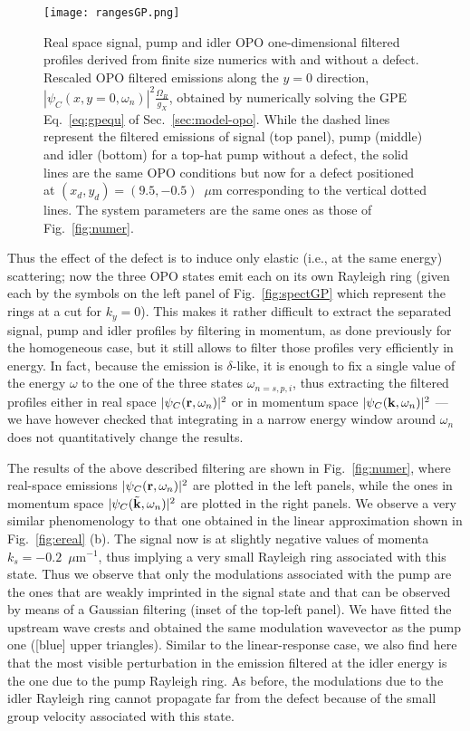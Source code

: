\begin{figure}[tb]\centering
\texttt{[image: rangesGP.png]}
\caption{Real space signal, pump and idler OPO one-dimensional
  filtered profiles derived from finite size numerics with and without
  a defect. Rescaled OPO filtered emissions along the $y=0$ direction,
  $|\psi_C(x,y=0,\omega_n)|^2 \frac{\Omega_R}{g_X}$, obtained by
  numerically solving the GPE Eq.~\eqref{eq:gpequ} of
  Sec.~\ref{sec:model-opo}. While the dashed lines represent the
  filtered emissions of signal (top panel), pump (middle) and idler
  (bottom) for a top-hat pump without a defect, the solid lines are
  the same OPO conditions but now for a defect positioned at
  $(x_d, y_d) = (9.5, -0.5)$~$\mu$m corresponding to the vertical
  dotted lines. The system parameters are the same ones as those of
  Fig.~\ref{fig:numer}.}
\label{fig:rafull}
\end{figure}
%
Thus the effect of the defect is to induce only elastic (i.e., at the
same energy) scattering; now the three OPO states emit each on its own
Rayleigh ring (given each by the symbols on the left panel of
Fig.~\ref{fig:spectGP} which represent the rings at a cut for
$k_y=0$). This makes it rather difficult to extract the separated
signal, pump and idler profiles by filtering in momentum, as done
previously for the homogeneous case, but it still allows to filter
those profiles very efficiently in energy. In fact, because the
emission is $\delta$-like, it is enough to fix a single value of the
energy $\omega$ to the one of the three states $\omega_{n=s,p,i}$,
thus extracting the filtered profiles either in real space
$|\psi_C(\mathbf{r},\omega_n)|^2$ or in momentum space
$|\psi_C(\mathbf{k},\omega_n)|^2$ --- we have however checked that
integrating in a narrow energy window around $\omega_n$ does not
quantitatively change the results.

The results of the above described filtering are shown in
Fig.~\ref{fig:numer}, where real-space emissions
$|\psi_C (\mathbf{r},\omega_n)|^2$ are plotted in the left panels, while
the ones in momentum space $|\psi_C (\tilde{\mathbf{k}},\omega_n)|^2$ are
plotted in the right panels. We observe a very similar phenomenology
to that one obtained in the linear approximation shown in
Fig.~\ref{fig:ereal} (b). The signal now is at slightly negative
values of momenta $k_s=-0.2$~$\mu$m$^{-1}$, thus implying a very small
Rayleigh ring associated with this state. Thus we observe that only
the modulations associated with the pump are the ones that are weakly
imprinted in the signal state and that can be observed by means of a
Gaussian filtering (inset of the top-left panel). We have fitted the
upstream wave crests and obtained the same modulation wavevector as
the pump one ([blue] upper triangles). Similar to the linear-response
case, we also find here that the most visible perturbation in the
emission filtered at the idler energy is the one due to the pump
Rayleigh ring. As before, the modulations due to the idler Rayleigh
ring cannot propagate far from the defect because of the small group
velocity associated with this state.

